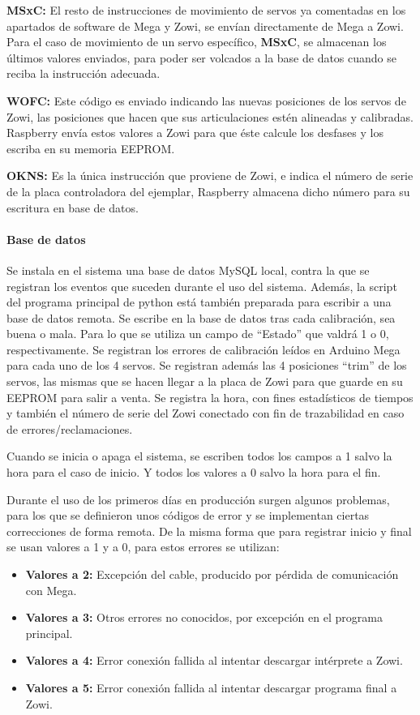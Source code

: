 \textbf{MSxC:}
El resto de instrucciones de movimiento de servos ya comentadas en los apartados de software de Mega y Zowi, se envían directamente de Mega a Zowi. Para el caso de movimiento de un servo específico, \textbf{MSxC}, se almacenan los últimos valores enviados, para poder ser volcados a la base de datos cuando se reciba la instrucción adecuada.

\textbf{WOFC:}
Este código es enviado indicando las nuevas posiciones de los servos de Zowi, las posiciones que hacen que sus articulaciones estén alineadas y calibradas. Raspberry envía estos valores a Zowi para que éste calcule los desfases y los escriba en su memoria EEPROM.

\textbf{OKNS:}
Es la única instrucción que proviene de Zowi, e indica el número de serie de la placa controladora del ejemplar, Raspberry almacena dicho número para su escritura en base de datos.

\paragraph{Base de datos}

Se instala en el sistema una base de datos MySQL local, contra la que se registran los eventos que suceden durante el uso del sistema. Además, la script del programa principal de python está también preparada para escribir a una base de datos remota.
Se escribe en la base de datos tras cada calibración, sea buena o mala. Para lo que se utiliza un campo de ``Estado'' que valdrá 1 o 0, respectivamente.
Se registran los errores de calibración leídos en Arduino Mega para cada uno de los 4 servos.
Se registran además las 4 posiciones ``trim'' de los servos, las mismas que se hacen llegar a la placa de Zowi para que guarde en su EEPROM para salir a venta.
Se registra la hora, con fines estadísticos de tiempos y también el número de serie del Zowi conectado con fin de trazabilidad en caso de errores/reclamaciones.

Cuando se inicia o apaga el sistema, se escriben todos los campos a 1 salvo la hora para el caso de inicio. Y todos los valores a 0 salvo la hora para el fin.

Durante el uso de los primeros días en producción surgen algunos problemas, para los que se definieron unos códigos de error y se implementan ciertas correcciones de forma remota. De la misma forma que para registrar inicio y final se usan valores a 1 y a 0, para estos errores se utilizan:

\begin{itemize}
  \item \textbf{Valores a 2:} Excepción del cable, producido por pérdida de comunicación con Mega.
  \item \textbf{Valores a 3:} Otros errores no conocidos, por excepción en el programa principal.
  \item \textbf{Valores a 4:} Error conexión fallida al intentar descargar intérprete a Zowi.
  \item \textbf{Valores a 5:} Error conexión fallida al intentar descargar programa final a Zowi.
\end{itemize}

